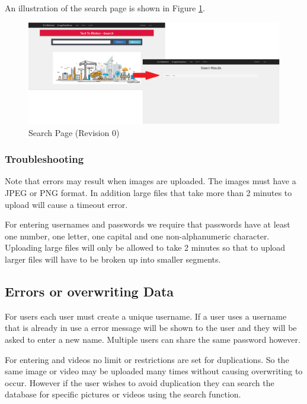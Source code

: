 \documentclass{scrreprt}
\begin{document}
An illustration of the search page is shown in Figure \ref{fig:searchPage}.

\begin{figure}
        \includegraphics[width=\linewidth]{searchTest.png}
        \caption{Search Page (Revision 0)}
        \label{fig:searchPage}
\end{figure}

\FloatBarrier

\subsubsection{Troubleshooting}

Note that errors may result when images are uploaded.  The images must have a
JPEG or PNG format.  In addition large files that take more than 2 minutes to
upload will cause a timeout error.

For entering usernames and passwords we require that passwords have at least
one number, one letter, one capital and one non-alphanumeric character.
Uploading large files will only be allowed to take 2 minutes so that to upload
larger files will have to be broken up into smaller segments.


\subsection{Errors or overwriting Data}

For users each user must create a unique username.  If a user uses a username
that is already in use a error message will be shown to the user and they will
be asked to enter a new name.  Multiple users can share the same password
however.

For entering and videos no limit or restrictions are set for duplications.  So
the same image or video may be uploaded many times without causing overwriting
to occur.  However if the user wishes to avoid duplication they can search the
database for specific pictures or videos using the search function.
\end{document}
